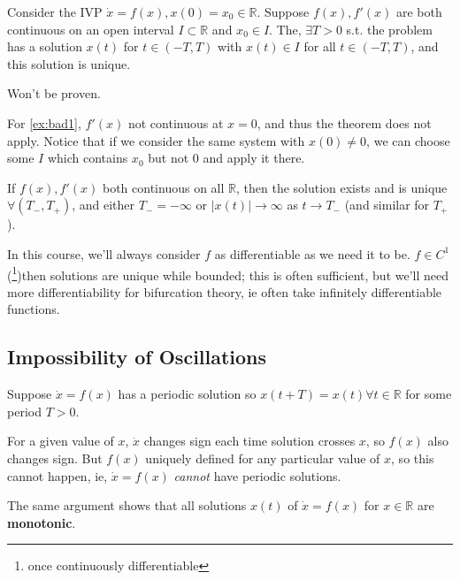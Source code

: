 \documentclass[12pt, oneside]{article}
\begin{document}
\begin{theorem}
  Consider the IVP $\dot{x}= f(x), x(0) = x_0 \in \mathbb{R}$. Suppose $f(x), f'(x)$ are both continuous on an open interval $I \subset \mathbb{R}$ and $x_0 \in I$. The, $\exists T > 0$ s.t. the problem has a solution $x(t)$ for $t \in (-T, T)$ with $x(t) \in I$ for all $t \in (-T,T)$, and this solution is unique.
\end{theorem}

\begin{remark}
  Won't be proven.
\end{remark}

\begin{remark}
  For \cref{ex:bad1}, $f'(x)$ not continuous at $x = 0$, and thus the theorem does not apply. Notice that if we consider the same system with $x(0) \neq 0$, we can choose some $I$ which contains $x_0$ but not $0$ and apply it there.
\end{remark}

\begin{corollary}
  If $f(x), f'(x)$ both continuous on all $\mathbb{R}$, then the solution exists and is unique $\forall (T_-, T_+)$, and either $T_- = - \infty$ or $|x(t)| \to \infty$ as $t \to T_-$ (and similar for $T_+$).
\end{corollary}

In this course, we'll always consider $f$ as differentiable as we need it to be. $f \in C^1$ (\footnote{once continuously differentiable})then solutions are unique while bounded; this is often sufficient, but we'll need more differentiability for bifurcation theory, ie often take infinitely differentiable functions.

\subsection{Impossibility of Oscillations}

Suppose $\dot{x} = f(x)$ has a periodic solution so $x(t+T) = x(t) \forall t \in \mathbb{R}$ for some period $T > 0$.

For a given value of $x$, $\dot{x}$ changes sign each time solution crosses $x$, so $f(x)$ also changes sign. But $f(x)$ uniquely defined for any particular value of $x$, so this cannot happen, ie, $\dot{x} = f(x)$ \textit{cannot} have periodic solutions.

The same argument shows that all solutions $x(t)$ of $\dot{x} = f(x)$ for $x \in \mathbb{R}$ are \textbf{monotonic}.
\end{document}
